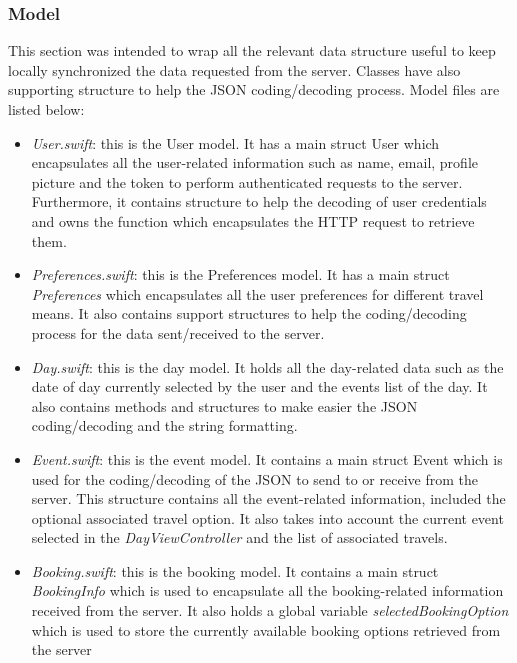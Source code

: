\subsubsection*{Model}
This section was intended to wrap all the relevant data structure useful to keep locally synchronized the data requested from the server. Classes have also supporting structure to help the JSON coding/decoding process. Model files are listed below:

\begin{itemize}
	\item \textit{User.swift}: this is the User model. It has a main struct User which encapsulates all the user-related information such as name, email, profile picture and the token to perform authenticated requests to the server. Furthermore, it contains structure to help the decoding of user credentials and owns the function which encapsulates the HTTP request to retrieve them.
	
	\item \textit{Preferences.swift}: this is the Preferences model. It has a main struct \textit{Preferences} which encapsulates all the user preferences for different travel means. It also contains support structures to help the coding/decoding process for the data sent/received to the server.
	
	\item \textit{Day.swift}: this is the day model. It holds all the day-related data such as the date of day currently selected by the user and the events list of the day. It also contains methods and structures to make easier the JSON coding/decoding and the string formatting.
	
	\item \textit{Event.swift}: this is the event model. It contains a main struct Event which is used for the coding/decoding of the JSON to send to or receive from the server. This structure contains all the event-related information, included the optional associated travel option. It also takes into account the current event selected in the \textit{DayViewController} and the list of associated travels.
	
	\item \textit{Booking.swift}: this is the booking model. It contains a main struct \textit{BookingInfo} which is used to encapsulate all the booking-related information received from the server. It also holds a global variable \textit{selectedBookingOption} which is used to store the currently available booking options retrieved from the server
\end{itemize}

